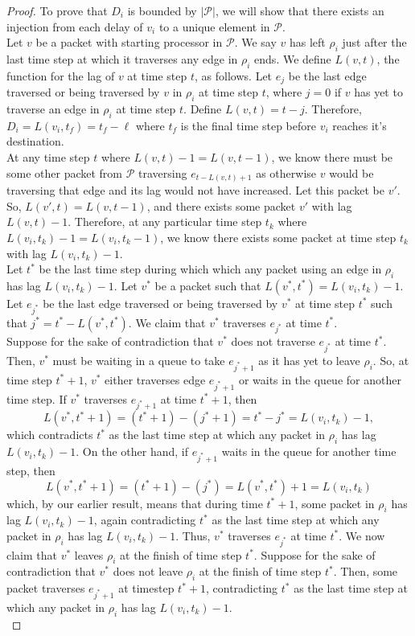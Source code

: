 \documentclass[psamsfonts, 10pt]{amsart}
\theoremstyle{definition}
\theoremstyle{remark}
\numberwithin{equation}{section}
\begin{document}
\begin{proof}
To prove that $D_i$ is bounded by $\lvert \mathcal{P} \rvert$, we will show that  there exists an injection from each delay of $v_i$ to a unique element in $\mathcal{P}$.\\

Let $v$ be a packet with starting processor in $\mathcal{P}$. We say $v$ has left $\rho_i$ just after the last time step at which it traverses any edge in $\rho_i$ ends. We define $L(v, t)$, the function for the lag of $v$ at time step $t$, as follows. Let $e_j$ be the last edge traversed or being traversed by $v$ in $\rho_i$ at time step $t$, where $j = 0$ if $v$ has yet to traverse an edge in $\rho_i$ at time step $t$. Define $L(v, t) = t-j$. Therefore, $D_i = L(v_i, t_f) = t_f - \ell$ where $t_f$ is the final time step before $v_i$ reaches it's destination.\\

At any time step $t$ where $L(v, t) -1 = L(v, t-1)$, we know there must be some other packet from $\mathcal{P}$ traversing $e_{t - L(v, t)+1}$ as otherwise $v$ would be traversing that edge and its lag would not have increased. Let this packet be $v'$. So, $L(v', t) = L(v, t-1)$, and there exists some packet $v'$ with lag $L(v, t) -1$. Therefore, at any particular time step $t_k$ where $L(v_i,t_k) -1 = L(v_i, t_k-1)$, we know there exists some packet at time step $t_k$ with lag $L(v_i,t_k) -1$.\\

 Let $t^*$ be the last time step during which which any packet using an edge in $\rho_i$ has lag $L(v_i,t_k) -1$. Let $v^*$ be a packet such that $L(v^*, t^*) = L(v_i, t_k)-1$.  Let $e_{j^*}$ be the last edge traversed or being traversed by $v^*$ at time step $t^*$ such that $j^* = t^* - L(v^*, t^*)$. We claim that $v^*$ traverses $e_{j^*}$ at time $t^*$.\\

Suppose for the sake of contradiction that $v^*$ does not traverse $e_{j^*}$ at time $t^*$. Then, $v^*$ must be waiting in a queue to take $e_{j^* + 1}$ as it has yet to leave $\rho_i$. So, at time step $t^* + 1$, $v^*$ either traverses edge $e_{j^* +1}$ or waits in the queue for another time step. If $v^*$ traverses $e_{j^* +1}$ at time $t^* + 1$, then
\[ L(v^*, t^* + 1) = (t^* + 1) - (j^* + 1) = t^* - j^* = L(v_i, t_k)-1,
\]
which contradicts $t^*$ as the last time step at which any packet in $\rho_i$ has lag $L(v_i,t_k) -1$. On the other hand, if $e_{j^* +1}$ waits in the queue for another time step, then
\[
L(v^*, t^* + 1) = (t^* + 1) - (j^*) = L(v^*, t^*) + 1 = L(v_i,t_k)
\]
which, by our earlier result, means that during time $t^* +1$, some packet in $\rho_i$ has lag $L(v_i,t_k) -1$, again contradicting $t^*$ as the last time step at which any packet in $\rho_i$ has lag $L(v_i,t_k)-1$. Thus, $v^*$ traverses $e_{j^*}$ at time $t^*$. We now claim that $v^*$ leaves $\rho_i$ at the finish of time step $t^*$. Suppose for the sake of contradiction that $v^*$ does not leave $\rho_i$ at the finish of time step $t^*$. Then, some packet traverses $e_{j^* + 1}$ at timestep $t^* + 1$, contradicting $t^*$ as the last time step at which any packet in $\rho_i$ has lag $L(v_i,t_k) -1$.\\


\end{proof}
\end{document}
